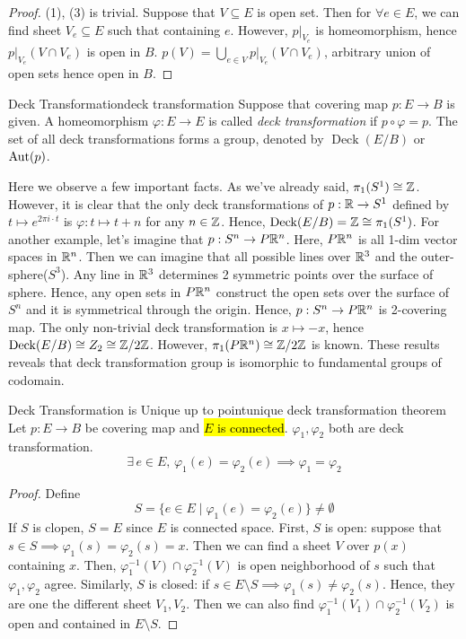 \documentclass[12pt, a4paper, twoside]{article}
\theoremstyle{plain}
\begin{document}
\begin{proof}
    (1), (3) is trivial. Suppose that $V \subseteq E$ is open set. 
    Then for $\forall e \in E$, we can find sheet $V_e \subseteq E$ such that containing $e$. 
    However, $p|_{V_e}$ is homeomorphism, hence $p|_{V_e}(V \cap V_e)$ is open in $B$. 
    $p(V) = \bigcup_{e \in V} p|_{V_e}(V \cap V_e)$, arbitrary union of open sets hence open in $B$. 
\end{proof}

\begin{defn}{Deck Transformation}{deck transformation}
    Suppose that covering map $p: E \rightarrow B$ is given. 
    A homeomorphism $\varphi: E \rightarrow E$ is called \textit{deck transformation} 
    if $p \circ \varphi = p$. 
    The set of all deck transformations forms a group, denoted by $\operatorname{Deck}(E/B)$ or ${\mathrm{Aut}}(p)$. 
\end{defn}

Here we observe a few important facts. As we've already said, $\pi_1(S^1) \cong {\mathbb {Z}}$. 
However, it is clear that the only deck transformations of $p: {\mathbb {R}} \rightarrow S^1$ defined by 
$t \mapsto e^{2\pi i \cdot t}$ is $\varphi: t \mapsto t + n$ for any $n \in {\mathbb {Z}}$. 
Hence, $\operatorname{Deck}(E/B) = {\mathbb {Z}} \cong \pi_1(S^1)$. 
For another example, let's imagine that $p: S^n \rightarrow P{\mathbb {R}}^n$. 
Here, $P{\mathbb {R}}^n$ is all 1-dim vector spaces in ${\mathbb {R}}^n$. 
Then we can imagine that all possible lines over ${\mathbb {R}}^3$ and the outer-sphere($S^3$). 
Any line in ${\mathbb {R}}^3$ determines 2 symmetric points over the surface of sphere. 
Hence, any open sets in $P{\mathbb {R}}^n$ construct the open sets over the surface of $S^n$ and it is 
symmetrical through the origin. Hence, $p: S^n \rightarrow P{\mathbb {R}}^n$ is 2-covering map. 
The only non-trivial deck transformation is $x \mapsto -x$, hence $\operatorname{Deck}(E/B) \cong Z_2 \cong {\mathbb {Z}}/2{\mathbb {Z}}$. 
However, $\pi_1(P{\mathbb {R}}^n) \cong {\mathbb {Z}}/2{\mathbb {Z}}$ is known. 
These results reveals that deck transformation group is isomorphic to fundamental groups of codomain. 

\begin{thm}{Deck Transformation is Unique up to point}{unique deck transformation theorem}
    Let $p: E \rightarrow B$ be covering map and \hl{$E$ is connected}. $\varphi_1, \varphi_2$ both are deck transformation. 
    \[\exists \, e \in E, \, \varphi_1(e) = \varphi_2(e) \implies \varphi_1 = \varphi_2\]
\end{thm}

\begin{proof}
    Define 
    \[S = \{e \in E \mid \varphi_1(e) = \varphi_2(e)\} \neq \emptyset\]
    If $S$ is clopen, $S = E$ since $E$ is connected space. 
    First, $S$ is open: suppose that $s \in S \implies \varphi_1(s) = \varphi_2(s) = x$. 
    Then we can find a sheet $V$ over $p(x)$ containing $x$. 
    Then, $\varphi_1^{-1}(V) \cap \varphi_2^{-1}(V)$ is open neighborhood of $s$ such that $\varphi_1, \varphi_2$ agree. 
    Similarly, $S$ is closed: if $s \in E \setminus S \implies \varphi_1(s) \neq \varphi_2(s)$. 
    Hence, they are one the different sheet $V_1, V_2$. 
    Then we can also find $\varphi_1^{-1}(V_1) \cap \varphi_2^{-1}(V_2)$ is open and contained in $E \setminus S$.  
\end{proof}
\end{document}
